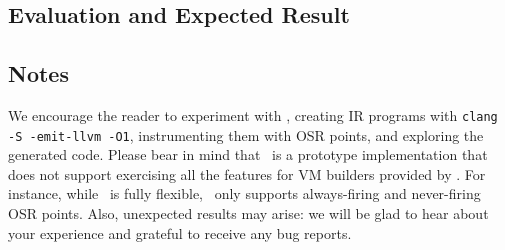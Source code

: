 \subsection{Evaluation and Expected Result}
\label{ss:art-eval-res}




\subsection{Notes}

We encourage the reader to experiment with \tinyvm, creating IR programs with {\tt clang -S -emit-llvm -O1}, instrumenting them with OSR points, and exploring the generated code. Please bear in mind that \tinyvm\ is a prototype implementation that does not support exercising all the features for VM builders provided by \osrkit. For instance, while \osrkit\ is fully flexible, \tinyvm\ only supports always-firing and never-firing OSR points. Also, unexpected results may arise: we will be glad to hear about your experience and grateful to receive any bug reports.




